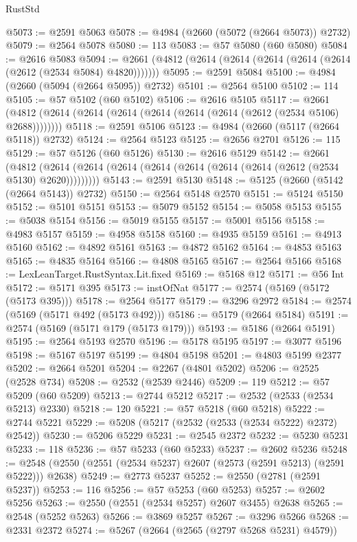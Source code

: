 \begin{lexlean}{RustStd}
\begin{coremodule}
@5073 := @2591 @5063
@5078 := @4984 (@2660 (@5072 (@2664 @5073)) @2732)
@5079 := @2564 @5078
@5080 := 113
@5083 := @57 @5080 (@60 @5080)
@5084 := @2616 @5083
@5094 := @2661 (@4812 (@2614 (@2614 (@2614 (@2614 (@2614 (@2612 (@2534 @5084) @4820)))))))
@5095 := @2591 @5084
@5100 := @4984 (@2660 (@5094 (@2664 @5095)) @2732)
@5101 := @2564 @5100
@5102 := 114
@5105 := @57 @5102 (@60 @5102)
@5106 := @2616 @5105
@5117 := @2661 (@4812 (@2614 (@2614 (@2614 (@2614 (@2614 (@2614 (@2612 (@2534 @5106) @2688))))))))
@5118 := @2591 @5106
@5123 := @4984 (@2660 (@5117 (@2664 @5118)) @2732)
@5124 := @2564 @5123
@5125 := @2656 @2701
@5126 := 115
@5129 := @57 @5126 (@60 @5126)
@5130 := @2616 @5129
@5142 := @2661
    (@4812 (@2614 (@2614 (@2614 (@2614 (@2614 (@2614 (@2614 (@2612 (@2534 @5130) @2620)))))))))
@5143 := @2591 @5130
@5148 := @5125 (@2660 (@5142 (@2664 @5143)) @2732)
@5150 := @2564 @5148 @2570
@5151 := @5124 @5150
@5152 := @5101 @5151
@5153 := @5079 @5152
@5154 := @5058 @5153
@5155 := @5038 @5154
@5156 := @5019 @5155
@5157 := @5001 @5156
@5158 := @4983 @5157
@5159 := @4958 @5158
@5160 := @4935 @5159
@5161 := @4913 @5160
@5162 := @4892 @5161
@5163 := @4872 @5162
@5164 := @4853 @5163
@5165 := @4835 @5164
@5166 := @4808 @5165
@5167 := @2564 @5166
@5168 := LexLeanTarget.RustSyntax.Lit.fixed
@5169 := @5168 @12
@5171 := @56 Int
@5172 := @5171 @395
@5173 := instOfNat
@5177 := @2574 (@5169 (@5172 (@5173 @395)))
@5178 := @2564 @5177
@5179 := @3296 @2972
@5184 := @2574 (@5169 (@5171 @492 (@5173 @492)))
@5186 := @5179 (@2664 @5184)
@5191 := @2574 (@5169 (@5171 @179 (@5173 @179)))
@5193 := @5186 (@2664 @5191)
@5195 := @2564 @5193 @2570
@5196 := @5178 @5195
@5197 := @3077 @5196
@5198 := @5167 @5197
@5199 := @4804 @5198
@5201 := @4803 @5199 @2377
@5202 := @2664 @5201
@5204 := @2267 (@4801 @5202)
@5206 := @2525 (@2528 @734)
@5208 := @2532 (@2539 @2446)
@5209 := 119
@5212 := @57 @5209 (@60 @5209)
@5213 := @2744 @5212
@5217 := @2532 (@2533 (@2534 @5213) @2330)
@5218 := 120
@5221 := @57 @5218 (@60 @5218)
@5222 := @2744 @5221
@5229 := @5208 (@5217 (@2532 (@2533 (@2534 @5222) @2372) @2542))
@5230 := @5206 @5229
@5231 := @2545 @2372
@5232 := @5230 @5231
@5233 := 118
@5236 := @57 @5233 (@60 @5233)
@5237 := @2602 @5236
@5248 := @2548 (@2550 (@2551 (@2534 @5237) @2607 (@2573 (@2591 @5213) (@2591 @5222))) @2638)
@5249 := @2773 @5237
@5252 := @2550 (@2781 (@2591 @5237))
@5253 := 116
@5256 := @57 @5253 (@60 @5253)
@5257 := @2602 @5256
@5263 := @2550 (@2551 (@2534 @5257) @2607 @3455) @2638
@5265 := @2548 (@5252 @5263)
@5266 := @3869 @5257
@5267 := @3296 @5266
@5268 := @2331 @2372
@5274 := @5267 (@2664 (@2565 (@2797 @5268 @5231) @4579))

\end{coremodule}
\end{lexlean}
